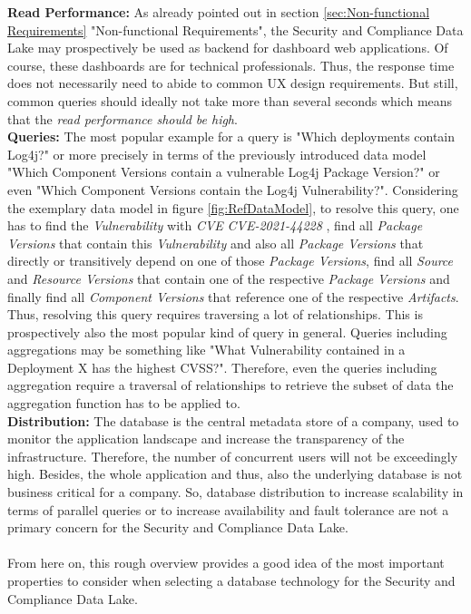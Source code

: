 \textbf{Read Performance:} As already pointed out in section \ref{sec:Non-functional Requirements} "Non-functional Requirements", the Security and Compliance Data Lake may prospectively be used as backend for dashboard web applications. Of course, these dashboards are for technical professionals. Thus, the response time does not necessarily need to abide to common UX design requirements. But still, common queries should ideally not take more than several seconds which means that the \emph{read performance should be high}.\\
\textbf{Queries:} The most popular example for a query is "Which deployments contain Log4j?" or more precisely in terms of the previously introduced data model "Which Component Versions contain a vulnerable Log4j Package Version?" or even "Which Component Versions contain the Log4j Vulnerability?". Considering the exemplary data model in figure \ref{fig:RefDataModel}, to resolve this query, one has to find the \emph{Vulnerability} with \emph{CVE} \textit{CVE-2021-44228} \cite{Log4jVuln}, find all \emph{Package Versions} that contain this \emph{Vulnerability} and also all \emph{Package Versions} that directly or transitively depend on one of those \emph{Package Versions}, find all \emph{Source} and \emph{Resource Versions} that contain one of the respective \emph{Package Versions} and finally find all \emph{Component Versions} that reference one of the respective \emph{Artifacts}. Thus, resolving this query requires traversing a lot of relationships. This is prospectively also the most popular kind of query in general. Queries including aggregations may be something like "What Vulnerability contained in a Deployment X has the highest CVSS?". Therefore, even the queries including aggregation require a traversal of relationships to retrieve the subset of data the aggregation function has to be applied to.\\
\textbf{Distribution:} The database is the central metadata store of a company, used to monitor the application landscape and increase the transparency of the infrastructure. Therefore, the number of concurrent users will not be exceedingly high. Besides, the whole application and thus, also the underlying database is not business critical for a company. So, database distribution to increase scalability in terms of parallel queries or to increase availability and fault tolerance are not a primary concern for the Security and Compliance Data Lake.\\\\ %
From here on, this rough overview provides a good idea of the most important properties to consider when selecting a database technology for the Security and Compliance Data Lake. 


